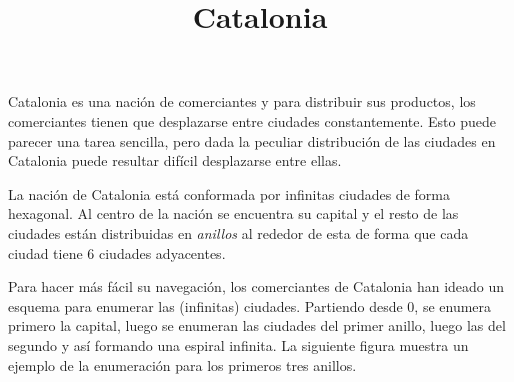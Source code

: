 \documentclass{oci}
\title{Catalonia}
\begin{document}
\begin{problemDescription}
Catalonia es una nación de comerciantes y para distribuir sus productos, los comerciantes tienen que
desplazarse entre ciudades constantemente.
Esto puede parecer una tarea sencilla, pero dada la peculiar distribución de las ciudades en
Catalonia puede resultar difícil desplazarse entre ellas.

La nación de Catalonia está conformada por infinitas ciudades de forma hexagonal.
Al centro de la nación se encuentra su capital y el resto de las ciudades están distribuidas
en \emph{anillos} al rededor de esta de forma que cada ciudad tiene 6 ciudades adyacentes.

Para hacer más fácil su navegación, los comerciantes de Catalonia han ideado un esquema
para enumerar las (infinitas) ciudades.
Partiendo desde 0, se enumera primero la capital, luego se enumeran las ciudades del primer anillo,
luego las del segundo y así formando una espiral infinita.
La siguiente figura muestra un ejemplo de la enumeración para los primeros tres anillos.

\newdimen\R
\R=1cm
\newcommand{\hex}[3][]{
  \begin{scope}[rotate=90, xshift=#3*1.5*\R, yshift=#2*-0.866*\R]
  \draw[thick,#1] (0:\R) \foreach \x in {60, 120,...,359} {
    --(\x:\R)
  } -- cycle(90:\R);
  \end{scope}
}
\newcommand{\pos}[2]{
  #1*0.866*\R, #2*1.5*\R
}
\begin{center}
\end{center}
\end{problemDescription}
\end{document}
